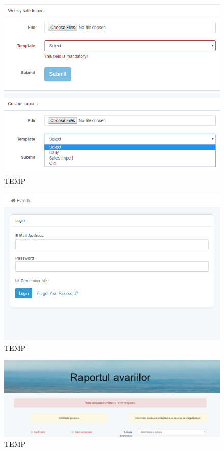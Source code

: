 	\begin{figure}
		\includegraphics[width=\linewidth]{../imagini/imports.png}
		\caption{TEMP}
		\label{fig:TEMP}
	\end{figure}
	\begin{figure}
		\includegraphics[width=\linewidth]{../imagini/login.png}
		\caption{TEMP}
		\label{fig:TEMP}
	\end{figure}
	\begin{figure}
		\includegraphics[width=\linewidth]{../imagini/main.png}
		\caption{TEMP}
		\label{fig:TEMP}
	\end{figure}
